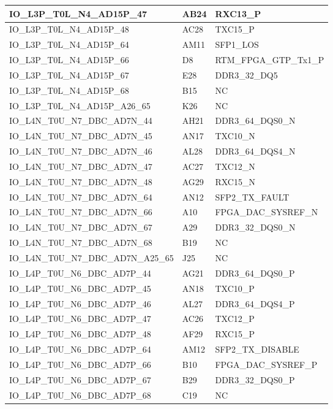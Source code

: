 \begin{footnotesize}
\begin{longtable}{|p{7cm}|p{1cm}|p{5cm}|}
IO\_L3P\_T0L\_N4\_AD15P\_47	&	AB24	&	RXC13\_P	\\ \hline
IO\_L3P\_T0L\_N4\_AD15P\_48	&	AC28	&	TXC15\_P	\\ \hline
IO\_L3P\_T0L\_N4\_AD15P\_64	&	AM11	&	SFP1\_LOS	\\ \hline
IO\_L3P\_T0L\_N4\_AD15P\_66	&	D8	&	RTM\_FPGA\_GTP\_Tx1\_P	\\ \hline
IO\_L3P\_T0L\_N4\_AD15P\_67	&	E28	&	DDR3\_32\_DQ5	\\ \hline
IO\_L3P\_T0L\_N4\_AD15P\_68	&	B15	&	NC	\\ \hline
IO\_L3P\_T0L\_N4\_AD15P\_A26\_65	&	K26	&	NC	\\ \hline
IO\_L4N\_T0U\_N7\_DBC\_AD7N\_44	&	AH21	&	DDR3\_64\_DQS0\_N	\\ \hline
IO\_L4N\_T0U\_N7\_DBC\_AD7N\_45	&	AN17	&	TXC10\_N	\\ \hline
IO\_L4N\_T0U\_N7\_DBC\_AD7N\_46	&	AL28	&	DDR3\_64\_DQS4\_N	\\ \hline
IO\_L4N\_T0U\_N7\_DBC\_AD7N\_47	&	AC27	&	TXC12\_N	\\ \hline
IO\_L4N\_T0U\_N7\_DBC\_AD7N\_48	&	AG29	&	RXC15\_N	\\ \hline
IO\_L4N\_T0U\_N7\_DBC\_AD7N\_64	&	AN12	&	SFP2\_TX\_FAULT	\\ \hline
IO\_L4N\_T0U\_N7\_DBC\_AD7N\_66	&	A10	&	FPGA\_DAC\_SYSREF\_N	\\ \hline
IO\_L4N\_T0U\_N7\_DBC\_AD7N\_67	&	A29	&	DDR3\_32\_DQS0\_N	\\ \hline
IO\_L4N\_T0U\_N7\_DBC\_AD7N\_68	&	B19	&	NC	\\ \hline
IO\_L4N\_T0U\_N7\_DBC\_AD7N\_A25\_65	&	J25	&	NC	\\ \hline
IO\_L4P\_T0U\_N6\_DBC\_AD7P\_44	&	AG21	&	DDR3\_64\_DQS0\_P	\\ \hline
IO\_L4P\_T0U\_N6\_DBC\_AD7P\_45	&	AN18	&	TXC10\_P	\\ \hline
IO\_L4P\_T0U\_N6\_DBC\_AD7P\_46	&	AL27	&	DDR3\_64\_DQS4\_P	\\ \hline
IO\_L4P\_T0U\_N6\_DBC\_AD7P\_47	&	AC26	&	TXC12\_P	\\ \hline
IO\_L4P\_T0U\_N6\_DBC\_AD7P\_48	&	AF29	&	RXC15\_P	\\ \hline
IO\_L4P\_T0U\_N6\_DBC\_AD7P\_64	&	AM12	&	SFP2\_TX\_DISABLE	\\ \hline
IO\_L4P\_T0U\_N6\_DBC\_AD7P\_66	&	B10	&	FPGA\_DAC\_SYSREF\_P	\\ \hline
IO\_L4P\_T0U\_N6\_DBC\_AD7P\_67	&	B29	&	DDR3\_32\_DQS0\_P	\\ \hline
IO\_L4P\_T0U\_N6\_DBC\_AD7P\_68	&	C19	&	NC	\\ \hline

\end{longtable}
\end{footnotesize}
